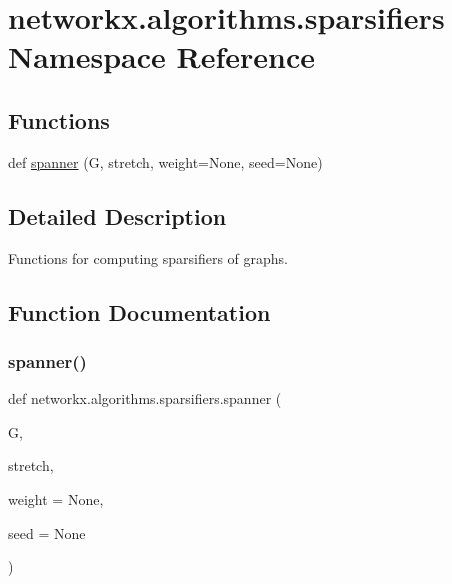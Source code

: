 \hypertarget{namespacenetworkx_1_1algorithms_1_1sparsifiers}{}\section{networkx.\+algorithms.\+sparsifiers Namespace Reference}
\label{namespacenetworkx_1_1algorithms_1_1sparsifiers}
\subsection*{Functions}
\begin{DoxyCompactItemize}
\item 
def \hyperlink{namespacenetworkx_1_1algorithms_1_1sparsifiers_a2ab390d047691f67cf329a26b7bcdb1f}{spanner} (G, stretch, weight=None, seed=None)
\end{DoxyCompactItemize}


\subsection{Detailed Description}
\begin{DoxyVerb}Functions for computing sparsifiers of graphs.\end{DoxyVerb}
 

\subsection{Function Documentation}
\mbox{\label{namespacenetworkx_1_1algorithms_1_1sparsifiers_a2ab390d047691f67cf329a26b7bcdb1f}} 
\subsubsection{\texorpdfstring{spanner()}{spanner()}}
{\footnotesize\ttfamily def networkx.\+algorithms.\+sparsifiers.\+spanner (\begin{DoxyParamCaption}\item[{}]{G,  }\item[{}]{stretch,  }\item[{}]{weight = {\ttfamily None},  }\item[{}]{seed = {\ttfamily None} }\end{DoxyParamCaption})}

